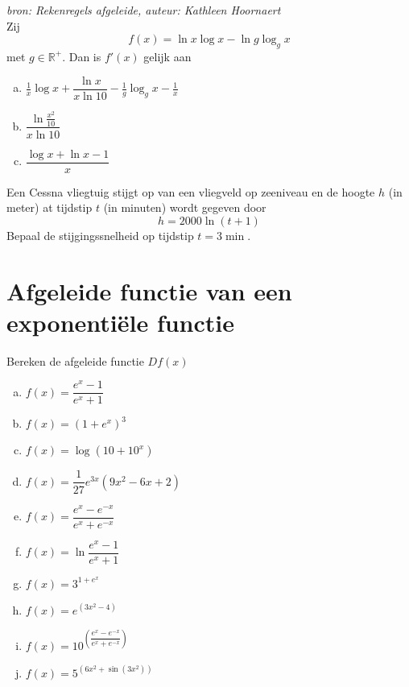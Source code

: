 \documentclass[a4paper,12pt]{article}
\begin{document}
\begin{oefening}
{\em \scriptsize bron: Rekenregels afgeleide, auteur: Kathleen Hoornaert}\\
Zij
$$f(x)=\ln x \log x - \ln g \log_g x$$
met $g\in \mathbb{R}^+$. Dan is $f'(x)$ gelijk aan
\begin{enumerate}[(a)]
  \itemsep.8em
  \item $\frac{1}{x} \log x + \dfrac{\ln x}{x \ln 10} - \frac{1}{g}\log_g x - \frac{1}{x}$
  \item $\dfrac{\ln \frac{x^2}{10}}{x \ln 10}$
  \item $\dfrac{\log x + \ln x - 1}{x}$
\end{enumerate}
\end{oefening}

\begin{oefening}
Een Cessna vliegtuig stijgt op van een vliegveld op zeeniveau en de hoogte $h$ (in meter) at tijdstip $t$ (in minuten) wordt gegeven door
$$h=2000 \ln(t+1)$$
Bepaal de stijgingssnelheid op tijdstip $t=3\min$.
\end{oefening}
\vspace*{-1cm}

\pagebreak
\section{Afgeleide functie van een exponentiële functie}

\begin{oefening}
Bereken de afgeleide functie $Df(x)$
\begin{multicols}{2}
\begin{enumerate}[(a)]
  \itemsep0.8em
  \item $f(x)=\dfrac{e^x-1}{e^x+1}$
  \item $f(x)=(1+e^x)^3$
  \item $f(x)=\log(10+10^x)$
  \item $f(x)=\dfrac{1}{27}e^{3x}(9x^2-6x+2)$
  \item $f(x)=\dfrac{e^x-e^{-x}}{e^x+e^{-x}}$
  \item $f(x)=\ln\dfrac{e^x-1}{e^x+1}$
  \item $f(x)=3^{1+e^x}$
  \item $f(x)=e^{(3x^2-4)}$
  \item $f(x)=10^{\left(\dfrac{e^x-e^{-x}}{e^x+e^{-x}}\right)}$
  \item $f(x)=5^{\left(6x^2+\sin(3x^2)\right)}$
\end{enumerate}
\end{multicols}
\end{oefening}
\end{document}
